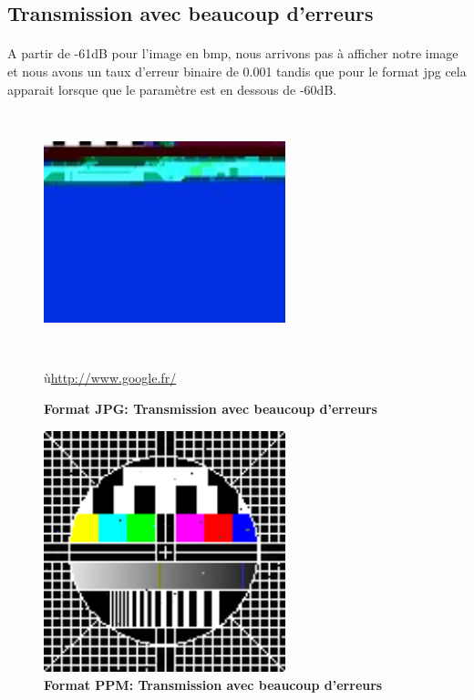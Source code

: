 \subsection{Transmission avec beaucoup d’erreurs}
\paragraph{}

 A partir de -61dB pour l'image en bmp, nous arrivons pas à afficher notre image et nous avons un taux d'erreur binaire de 0.001 tandis que pour le format jpg cela apparait lorsque que le paramètre est en dessous de -60dB.

\begin{figure}[bth]%
\begin{center}
\includegraphics[height=70mm,width=70mm]{jpg_test_bruit63dB}%
\caption{\textbf{Format JPG: Transmission avec beaucoup d’erreurs}}%
ù\url {http://www.google.fr/}
\label{jpg_test_bruit63dB}%
\end {center}
\end{figure}

\begin{figure}[bth]%
\begin{center}
\includegraphics[height=70mm,width=70mm]{BMP_test_bruit62dB}%
\caption{\textbf{Format PPM: Transmission avec beaucoup d’erreurs}}%
\label{BMP_test_bruit62dB}%
\end {center}
\end{figure}

